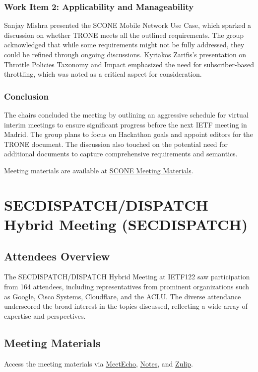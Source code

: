 \documentclass{article}
\begin{document}
\subsubsection{Work Item 2: Applicability and Manageability}

Sanjay Mishra presented the SCONE Mobile Network Use Case, which sparked a discussion on whether TRONE meets all the outlined requirements. The group acknowledged that while some requirements might not be fully addressed, they could be refined through ongoing discussions. Kyriakos Zarifis's presentation on Throttle Policies Taxonomy and Impact emphasized the need for subscriber-based throttling, which was noted as a critical aspect for consideration.

\subsubsection{Conclusion}

The chairs concluded the meeting by outlining an aggressive schedule for virtual interim meetings to ensure significant progress before the next IETF meeting in Madrid. The group plans to focus on Hackathon goals and appoint editors for the TRONE document. The discussion also touched on the potential need for additional documents to capture comprehensive requirements and semantics.

Meeting materials are available at \href{https://meetings.conf.meetecho.com/ietf122/?session=33930}{SCONE Meeting Materials}.



\newpage

\section{SECDISPATCH/DISPATCH Hybrid Meeting (SECDISPATCH)}

\subsection{Attendees Overview}
The SECDISPATCH/DISPATCH Hybrid Meeting at IETF122 saw participation from 164 attendees, including representatives from prominent organizations such as Google, Cisco Systems, Cloudflare, and the ACLU. The diverse attendance underscored the broad interest in the topics discussed, reflecting a wide array of expertise and perspectives.

\subsection{Meeting Materials}
Access the meeting materials via \href{https://meetings.conf.meetecho.com/ietf122/?session=33976}{MeetEcho}, \href{https://notes.ietf.org/notes-ietf-122-secdispatch}{Notes}, and \href{https://zulip.ietf.org/#narrow/stream/secdispatch}{Zulip}.
\end{document}
